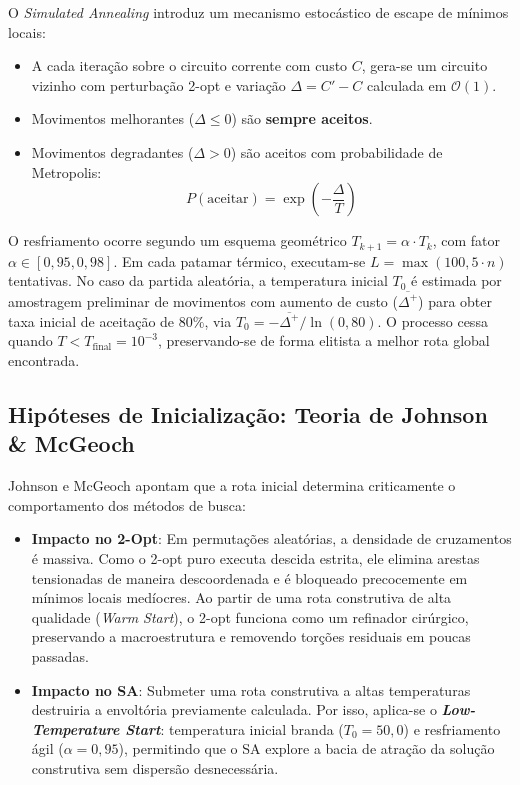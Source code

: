 \documentclass[12pt, a4paper]{article}
\begin{document}
O \textit{Simulated Annealing} \cite{kirkpatrick1983, cerny1985} introduz um mecanismo estocástico de escape de mínimos locais:
\begin{itemize}
    \item A cada iteração sobre o circuito corrente com custo $C$, gera-se um circuito vizinho com perturbação 2-opt e variação $\Delta = C' - C$ calculada em $\mathcal{O}(1)$.
    \item Movimentos melhorantes ($\Delta \le 0$) são \textbf{sempre aceitos}.
    \item Movimentos degradantes ($\Delta > 0$) são aceitos com probabilidade de Metropolis:
          \begin{equation}
              P(\text{aceitar}) = \exp\left(-\frac{\Delta}{T}\right)
          \end{equation}
\end{itemize}

O resfriamento ocorre segundo um esquema geométrico $T_{k+1} = \alpha \cdot T_k$, com fator $\alpha \in [0{,}95, 0{,}98]$. Em cada patamar térmico, executam-se $L = \max(100, 5 \cdot n)$ tentativas. No caso da partida aleatória, a temperatura inicial $T_0$ é estimada por amostragem preliminar de movimentos com aumento de custo ($\overline{\Delta^+}$) para obter taxa inicial de aceitação de $80\%$, via $T_0 = -\overline{\Delta^+} / \ln(0{,}80)$. O processo cessa quando $T < T_{\mathrm{final}} = 10^{-3}$, preservando-se de forma elitista a melhor rota global encontrada.

\subsection{Hipóteses de Inicialização: Teoria de Johnson \& McGeoch}

Johnson e McGeoch \cite{johnson1997} apontam que a rota inicial determina criticamente o comportamento dos métodos de busca:
\begin{itemize}
    \item \textbf{Impacto no 2-Opt}: Em permutações aleatórias, a densidade de cruzamentos é massiva. Como o 2-opt puro executa descida estrita, ele elimina arestas tensionadas de maneira descoordenada e é bloqueado precocemente em mínimos locais medíocres. Ao partir de uma rota construtiva de alta qualidade (\textit{Warm Start}), o 2-opt funciona como um refinador cirúrgico, preservando a macroestrutura e removendo torções residuais em poucas passadas.
    \item \textbf{Impacto no SA}: Submeter uma rota construtiva a altas temperaturas destruiria a envoltória previamente calculada. Por isso, aplica-se o \textbf{\textit{Low-Temperature Start}}: temperatura inicial branda ($T_0 = 50{,}0$) e resfriamento ágil ($\alpha = 0{,}95$), permitindo que o SA explore a bacia de atração da solução construtiva sem dispersão desnecessária.
\end{itemize}
\end{document}
